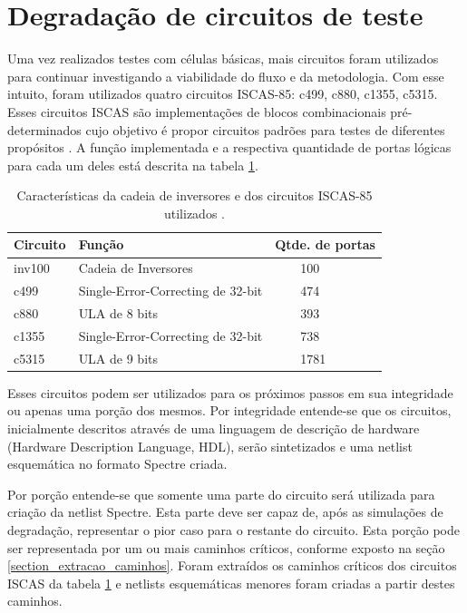 \section{Degradação de circuitos de teste}
\label{section:caracterização_iscas}
Uma vez realizados testes com células básicas, mais circuitos foram utilizados para continuar investigando a viabilidade do fluxo e da metodologia. Com esse intuito, foram utilizados quatro circuitos ISCAS-85: c499, c880, c1355, c5315. Esses circuitos ISCAS são implementações de blocos combinacionais pré-determinados cujo objetivo é propor circuitos padrões para testes de diferentes propósitos \cite{Hansen1999}. A função implementada e a respectiva quantidade de portas lógicas para cada um deles está descrita na tabela \ref{tb:ISCAS_85}.

\begin{table}[H]
\centering
\caption{Características da cadeia de inversores e dos circuitos ISCAS-85 utilizados \cite{Hansen1999}.}
\begin{tabular}{@{}lll@{}}
\toprule
Circuito & Função & Qtde. de portas \\ \midrule
inv100 & Cadeia de Inversores & \ \ \ \ 100 \\ \midrule
c499 & Single-Error-Correcting de 32-bit & \ \ \ \ 474 \\ \midrule
c880 & ULA de 8 bits & \ \ \ \ 393 \\ \midrule
c1355 & Single-Error-Correcting de 32-bit & \ \ \ \ 738 \\ \midrule
c5315 & ULA de 9 bits & \ \ \ \ 1781 \\ \bottomrule
\end{tabular}
\label{tb:ISCAS_85}
\end{table}
Esses circuitos podem ser utilizados para os próximos passos em sua integridade ou apenas uma porção dos mesmos. Por integridade entende-se que os circuitos, inicialmente descritos através de uma linguagem de descrição de hardware (Hardware Description Language, HDL), serão sintetizados e uma netlist esquemática no formato Spectre criada. 

Por porção entende-se que somente uma parte do circuito será utilizada para criação da netlist Spectre. Esta parte deve ser capaz de, após as simulações de degradação, representar o pior caso para o restante do circuito. Esta porção pode ser representada por um ou mais caminhos críticos, conforme exposto na seção \ref{section_extracao_caminhos}.
Foram extraídos os caminhos críticos dos circuitos ISCAS da tabela \ref{tb:ISCAS_85} e netlists esquemáticas menores foram criadas a partir destes caminhos.

